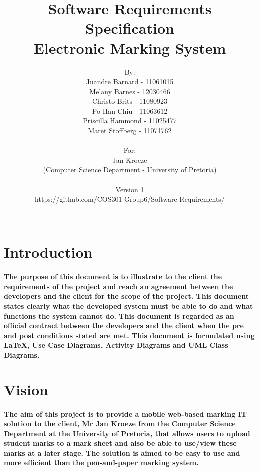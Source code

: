 \documentclass[12pt]{article}
\begin{document}
\title{Software Requirements Specification\\
Electronic Marking System}
\author{By: \\ Juandre Barnard - 11061015 \\ Melany Barnes - 12030466 \\ Christo Brits - 11080923 \\ Po-Han Chiu - 11063612 \\ Priscilla Hammond - 11025477 \\ Maret Stoffberg - 11071762 \\ \\ For: \\ Jan Kroeze \\ (Computer Science Department - University of Pretoria) \\ \\ Version 1 \\ https://github.com/COS301-Group6/Software-Requirements/ \\ \\}
  \maketitle   \pagebreak
  \tableofcontents
  \pagebreak
  \section{Introduction}
  \paragraph*{The purpose of this document is to illustrate to the client the requirements of the project and reach an agreement between the developers and the client for the scope of the project. This document states clearly what the developed system must be able to do and what functions the system cannot do. This document is regarded as an official contract between the developers and the client when the pre and post conditions stated are met. This document is formulated using LaTeX, Use Case Diagrams, Activity Diagrams and UML Class Diagrams.}
  \section{Vision}
  \paragraph*{The aim of this project is to provide a mobile web-based marking IT solution to the client, Mr Jan Kroeze from the Computer Science Department at the University of Pretoria, that allows users to upload student marks to a mark sheet and also be able to use/view these marks at a later stage. The solution is aimed to be easy to use and more efficient than the pen-and-paper marking system.}
\end{document}
